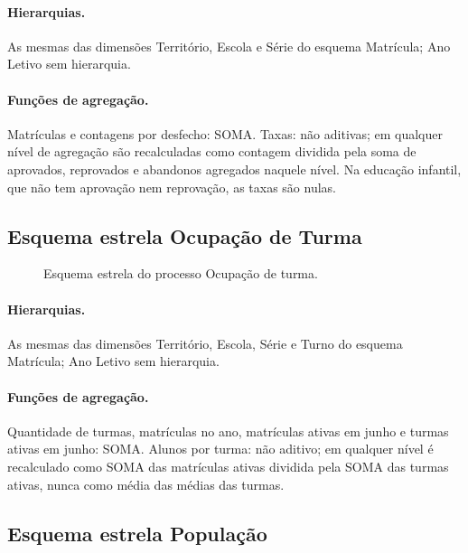 \documentclass[11pt,a4paper]{article}
\begin{document}
\paragraph{Hierarquias.} As mesmas das dimensões Território, Escola e Série do esquema Matrícula; Ano Letivo sem hierarquia.

\paragraph{Funções de agregação.} Matrículas e contagens por desfecho: SOMA. Taxas: não aditivas; em qualquer nível de agregação são recalculadas como contagem dividida pela soma de aprovados, reprovados e abandonos agregados naquele nível. Na educação infantil, que não tem aprovação nem reprovação, as taxas são nulas.

\subsection{Esquema estrela Ocupação de Turma}

\begin{figure}[H]
\centering
\resizebox{0.9\linewidth}{!}{}
\caption{Esquema estrela do processo Ocupação de turma.}
\end{figure}

\paragraph{Hierarquias.} As mesmas das dimensões Território, Escola, Série e Turno do esquema Matrícula; Ano Letivo sem hierarquia.

\paragraph{Funções de agregação.} Quantidade de turmas, matrículas no ano, matrículas ativas em junho e turmas ativas em junho: SOMA. Alunos por turma: não aditivo; em qualquer nível é recalculado como SOMA das matrículas ativas dividida pela SOMA das turmas ativas, nunca como média das médias das turmas.

\subsection{Esquema estrela População}
\end{document}
